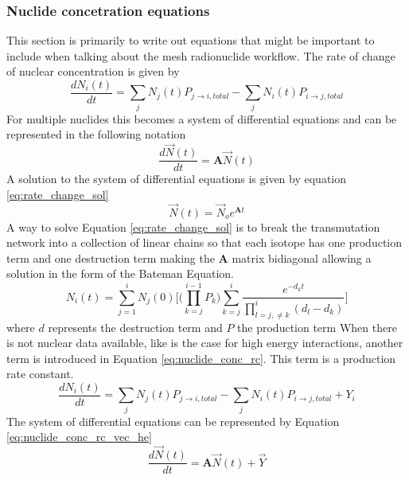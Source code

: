 \subsubsection{Nuclide concetration equations}
This section is primarily to write out equations that might be
important to include when talking about the mesh radionuclide
workflow.
The rate of change of nuclear concentration is given by
\begin{equation}\label{eq:nuclide_conc_rc}
    \frac{dN_{i}(t)}{dt} = \sum_{j} N_{j}(t)P_{j \rightarrow i, total}
    - \sum_{j} N_{i}(t)P_{i \rightarrow j, total}
\end{equation}
For multiple nuclides this becomes a system of differential equations and
can be represented in the following notation
\begin{equation}\label{eq:nuclide_conc_rc_vec}
  \frac{d\vec{N}(t)}{dt} =\boldsymbol{A}  \vec{N}(t)
\end{equation}
A solution to the system of differential equations is given by equation \ref{eq:rate_change_sol}
\begin{equation}\label{eq:rate_change_sol}
  \vec{N}(t) =\vec{N}_{o} e^{\boldsymbol{A}t}
\end{equation}
A way to solve Equation \ref{eq:rate_change_sol} is to break the transmutation network
into a collection of linear chains so that each isotope has one production term and
one destruction term making the $\boldsymbol{A}$ matrix bidiagonal allowing a solution
in the form of the Bateman Equation.
\begin{equation}\label{eq:bateman}
  N_{i}(t) = \sum_{j=1}^{i} N_{j}(0)
  \Bigg[ \Bigg( \prod_{k=j}^{i-1} P_{k} \Bigg)
  \sum_{k=j}^{i}\frac{e^{-d_{k}t}}{\displaystyle \prod_{l=j,\neq k}^{i}(d_{l} -d_{k})}
  \Bigg]
\end{equation}
where $d$ represents the destruction term and $P$ the production   term
When there is not nuclear data available, like is the case for high energy interactions,
another term is introduced in Equation \ref{eq:nuclide_conc_rc}. This term is a
production rate constant.
\begin{equation}\label{eq:nuclide_conc_rc_he}
    \frac{dN_{i}(t)}{dt} = \sum_{j} N_{j}(t)P_{j \rightarrow i, total}
    - \sum_{j} N_{i}(t)P_{i \rightarrow j, total} + Y_{i}
\end{equation}
The system of differential equations can be represented by
Equation \ref{eq:nuclide_conc_rc_vec_he}
\begin{equation}\label{eq:nuclide_conc_rc_vec_he}
  \frac{d\vec{N}(t)}{dt} =\boldsymbol{A}  \vec{N}(t) + \vec{Y}
\end{equation}
